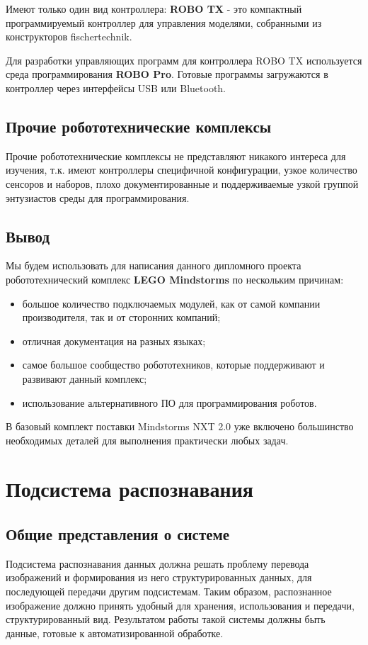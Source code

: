 Имеют только один вид контроллера: \textbf{ROBO TX} - это компактный программируемый контроллер для управления моделями, собранными из конструкторов fischertechnik.

Для разработки управляющих программ для контроллера ROBO TX используется среда программирования \textbf{ROBO Pro}. Готовые программы загружаются в контроллер через интерфейсы USB или Bluetooth.

\subsection{Прочие робототехнические комплексы}

Прочие робототехнические комплексы не представляют никакого интереса для изучения, т.к.  имеют контроллеры специфичной конфигурации, узкое количество сенсоров и наборов, плохо документированные и поддерживаемые узкой группой энтузиастов среды для программирования.

\subsection{Вывод}
Мы будем использовать для написания данного дипломного проекта робототехнический комплекс \textbf{LEGO Mindstorms} по нескольким причинам:
\begin{itemize}
\item большое количество подключаемых модулей, как от самой компании производителя, так и от сторонних компаний;
\item отличная документация на разных языках;
\item самое большое сообщество робототехников, которые поддерживают и развивают данный комплекс;
\item использование альтернативного ПО для программирования роботов.
\end{itemize}

В базовый комплект поставки Mindstorms NXT 2.0 уже включено большинство необходимых деталей для выполнения практически любых задач.


\section{Подсистема распознавания}
\subsection{Общие представления о системе}

Подсистема распознавания данных должна решать проблему перевода изображений и формирования из него структурированных данных, для последующей передачи другим подсистемам. Таким образом, распознанное изображение должно принять удобный для хранения, использования и передачи, структурированный вид. Результатом работы такой системы должны быть данные, готовые к автоматизированной обработке. 

